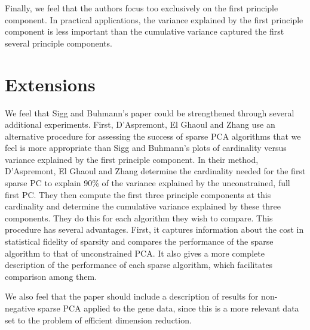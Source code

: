 \documentclass{article}
\begin{document}
Finally, we feel that the authors focus too exclusively on
the first principle component.
In practical applications, the variance explained by the first
principle component is less important than the cumulative variance
captured the first several principle components.

\section{Extensions}

We feel that Sigg and Buhmann's paper could be strengthened
through several additional experiments. First,
D'Aspremont, El Ghaoul and Zhang
use an alternative procedure for assessing the success of
sparse PCA algorithms that we feel is more appropriate than
Sigg and Buhmann's plots of cardinality versus variance explained
by the first principle component.
In their method, D'Aspremont, El Ghaoul and Zhang
determine the cardinality needed for the
first sparse PC to explain 90\% of the variance explained
by the unconstrained, full first PC.
They then compute the first three principle components at this
cardinality and determine the cumulative variance explained by
these three components. They do this for each algorithm they
wish to compare. This procedure has several advantages.
First, it captures information about the cost in statistical
fidelity of sparsity and compares the performance of the sparse algorithm
to that of unconstrained PCA. It also gives a more complete
description of the performance of each sparse algorithm, which
facilitates comparison among them.

We also feel that the paper should include a description of
results for non-negative sparse PCA applied to the gene data,
since this is a more relevant data set to the problem of
efficient dimension reduction.
\end{document}
